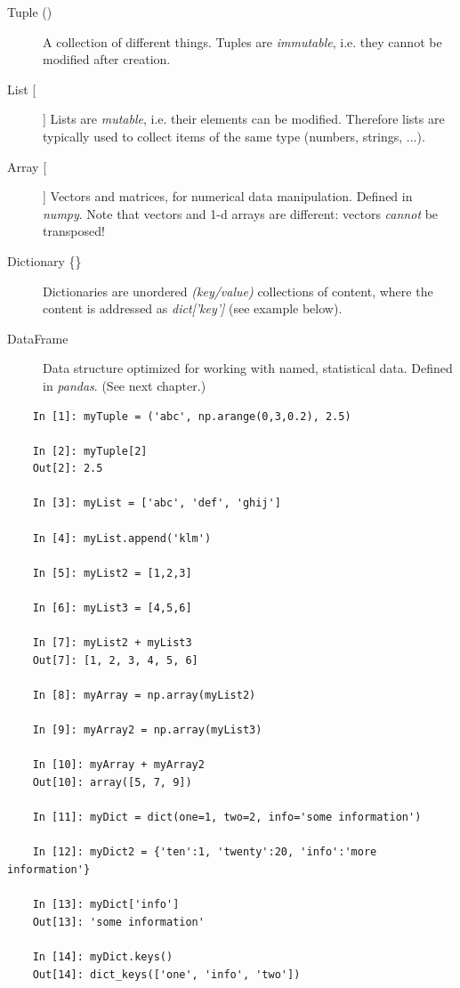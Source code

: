 \begin{description}
  \item[Tuple ()] A collection of different things. Tuples are \emph{immutable}, i.e. they cannot be modified after creation.
  \item[List [] ] Lists are \emph{mutable}, i.e. their elements can be modified. Therefore lists are typically used to collect items of the same type (numbers, strings, ...).
  \item[Array [] ] Vectors and matrices, for numerical data manipulation. Defined in \emph{numpy}. Note that vectors and 1-d arrays are different: vectors \emph{cannot} be transposed!
  \item[Dictionary \{\}] Dictionaries are unordered \emph{(key/value)} collections of content, where the content is addressed as \emph{dict['key']} (see example below).
  \item[DataFrame] Data structure optimized for working with named, statistical data. Defined in \emph{pandas}. (See next chapter.)
\end{description}

\begin{lstlisting}
    In [1]: myTuple = ('abc', np.arange(0,3,0.2), 2.5)

    In [2]: myTuple[2]
    Out[2]: 2.5

    In [3]: myList = ['abc', 'def', 'ghij']

    In [4]: myList.append('klm')

    In [5]: myList2 = [1,2,3]

    In [6]: myList3 = [4,5,6]

    In [7]: myList2 + myList3
    Out[7]: [1, 2, 3, 4, 5, 6]

    In [8]: myArray = np.array(myList2)

    In [9]: myArray2 = np.array(myList3)

    In [10]: myArray + myArray2
    Out[10]: array([5, 7, 9])

    In [11]: myDict = dict(one=1, two=2, info='some information')

    In [12]: myDict2 = {'ten':1, 'twenty':20, 'info':'more information'}

    In [13]: myDict['info']
    Out[13]: 'some information'

    In [14]: myDict.keys()
    Out[14]: dict_keys(['one', 'info', 'two'])
\end{lstlisting}

